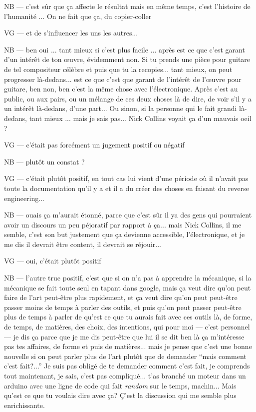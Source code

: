 NB — c'est sûr que ça affecte le résultat mais en même temps, c'est l'histoire de l'humanité ... On ne fait que ça, du copier-coller

VG — et de s'influencer les uns les autres...

NB — ben oui ... tant mieux si c'est plus facile ... après est ce que c'est garant d'un intérêt de ton œuvre, évidemment non. Si tu prends une pièce pour guitare de tel compositeur célèbre et puis que tu la recopies... tant mieux, on peut progresser là-dedans...  est ce que c'est que garant de l'intérêt de l'œuvre pour guitare, ben non, ben c'est la même chose avec l'électronique.  Après c'est au public, ou aux pairs, ou un mélange de ces deux choses là de dire, de voir s'il y a un intérêt là-dedans, d'une part... Ou sinon, si la personne qui le fait grandi là-dedans, tant mieux ... mais je sais pas... Nick Collins voyait ça d'un mauvais oeil ? 

VG — c'était pas forcément un jugement positif ou négatif

NB — plutôt un constat ?

VG — c'était plutôt positif, en tout cas lui vient d'une période où il n'avait pas toute la documentation qu'il y a et il a du créer des choses en faisant du reverse engineering...

NB — ouais ça m'aurait étonné, parce que c'est sûr il ya des gens qui pourraient avoir un discours un peu péjoratif par rapport à ça... mais Nick Collins, il me semble, c'est son but justement que ça devienne accessible, l'électronique, et je me dis il devrait être content, il devrait se réjouir...

VG — oui, c'était plutôt positif

NB — l'autre truc positif, c'est que si on n'a pas à apprendre la mécanique, si la mécanique se fait toute seul en tapant dans google, mais ça veut dire qu'on peut faire de l'art peut-être plus rapidement, et ça veut dire qu'on peut peut-être passer moins de temps à parler des outils, et puis qu'on peut passer peut-être plus de temps à parler de qu'est ce que tu aurais fait avec ces outils là, de forme, de temps, de matières, des choix, des intentions, qui pour moi — c'est personnel—  je dis ça parce que je me dis peut-être que lui il se dit ben là ça m'intéresse pas tes affaires, de forme et puis de matières... mais je pense que c'est une bonne nouvelle si on peut parler plus de l'art plutôt que de demander ``mais comment c'est fait?...'' Je suis pas obligé de te demander comment c'est fait, je comprends tout maintenant, je sais, c'est pas compliqué...  t'as branché un moteur dans un arduino avec une ligne de code qui fait \textit{random} sur le temps, machin... Mais qu'est ce que tu voulais dire avec ça? Ç'est la discussion qui me semble plus enrichissante. 

